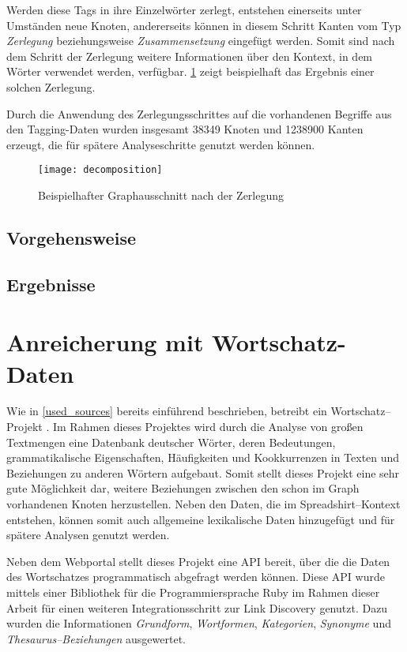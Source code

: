 Werden diese Tags in ihre Einzelwörter zerlegt, entstehen einerseits unter Umständen neue Knoten, andererseits können in diesem Schritt Kanten vom Typ \emph{Zerlegung} beziehungsweise \emph{Zusammensetzung} eingefügt werden. Somit sind nach dem Schritt der Zerlegung weitere Informationen über den Kontext, in dem Wörter verwendet werden, verfügbar. \cref{fig:decomposition} zeigt beispielhaft das Ergebnis einer solchen Zerlegung.

Durch die Anwendung des Zerlegungsschrittes auf die vorhandenen Begriffe aus den Tagging-Daten wurden insgesamt \num{38349} Knoten und \num{1238900} Kanten erzeugt, die für spätere Analyseschritte genutzt werden können.

\begin{figure}
\centering
\texttt{[image: decomposition]}
\caption{Beispielhafter Graphausschnitt nach der Zerlegung}
\label{fig:decomposition}
\end{figure}

\subsection{Vorgehensweise}

\subsection{Ergebnisse}

\section{Anreicherung mit Wortschatz-Daten}
\label{wortschatz}

Wie in \cref{used_sources} bereits einführend beschrieben, betreibt ein Wortschatz--Projekt \cite{ws2013}. Im Rahmen dieses Projektes wird durch die Analyse von großen Textmengen eine Datenbank deutscher Wörter, deren Bedeutungen, grammatikalische Eigenschaften, Häufigkeiten und Kookkurrenzen in Texten und Beziehungen zu anderen Wörtern aufgebaut. Somit stellt dieses Projekt eine sehr gute Möglichkeit dar, weitere Beziehungen zwischen den schon im Graph vorhandenen Knoten herzustellen. Neben den Daten, die im Spreadshirt--Kontext entstehen, können somit auch allgemeine lexikalische Daten hinzugefügt und für spätere Analysen genutzt werden.

Neben dem Webportal stellt dieses Projekt eine API bereit, über die die Daten des Wortschatzes programmatisch abgefragt werden können. Diese API wurde mittels einer Bibliothek für die Programmiersprache Ruby \cite{wlapi2013} im Rahmen dieser Arbeit für einen weiteren Integrationsschritt zur Link Discovery genutzt. Dazu wurden die Informationen \emph{Grundform}, \emph{Wortformen}, \emph{Kategorien}, \emph{Synonyme} und \emph{Thesaurus--Beziehungen} ausgewertet.


